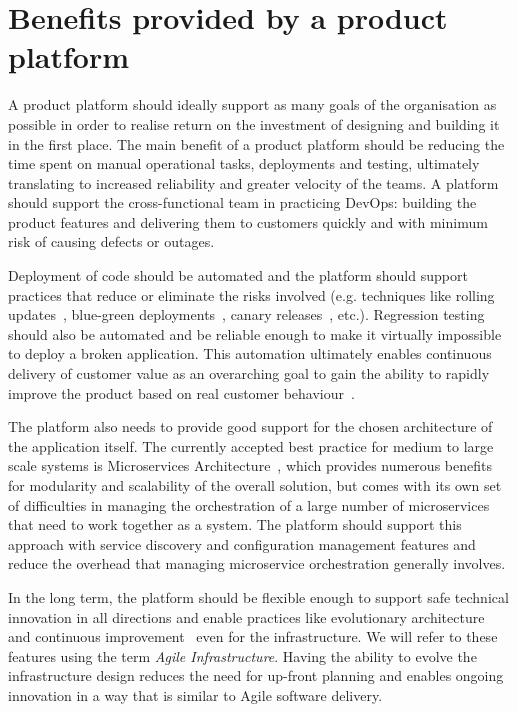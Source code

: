 \documentclass[reprint,amsmath,amssymb,aps]{revtex4-1}
\begin{document}
\section{Benefits provided by a product platform}
\label{sec:benefits}

A product platform should ideally support as many goals of the organisation as possible in order to realise return on the investment of designing and building it in the first place. The main benefit of a product platform should be reducing the time spent on manual operational tasks, deployments and testing, ultimately translating to increased reliability and greater velocity of the teams. A platform should support the cross-functional team in practicing DevOps: building the product features and delivering them to customers quickly and with minimum risk of causing defects or outages.

Deployment of code should be automated and the platform should support practices that reduce or eliminate the risks involved (e.g. techniques like rolling updates~\cite{Performi30:online}, blue-green deployments~\cite{BlueGree26:online}, canary releases~\cite{CanaryRe28:online}, etc.). Regression testing should also be automated and be reliable enough to make it virtually impossible to deploy a broken application. This automation ultimately enables continuous delivery of customer value as an overarching goal to gain the ability to rapidly improve the product based on real customer behaviour~\cite{Continuo59:online}.

The platform also needs to provide good support for the chosen architecture of the application itself. The currently accepted best practice for medium to large scale systems is Microservices Architecture~\cite{Microser99:online}, which provides numerous benefits for modularity and scalability of the overall solution, but comes with its own set of difficulties in managing the orchestration of a large number of microservices that need to work together as a system. The platform should support this approach with service discovery and configuration management features and reduce the overhead that managing microservice orchestration generally involves.

In the long term, the platform should be flexible enough to support safe technical innovation in all directions and enable practices like evolutionary architecture~\cite{Microser21:online} and continuous improvement~\cite{KaizenTh68:online} even for the infrastructure. We will refer to these features using the term \textit{Agile Infrastructure}. Having the ability to evolve the infrastructure design reduces the need for up-front planning and enables ongoing innovation in a way that is similar to Agile software delivery.
\end{document}
